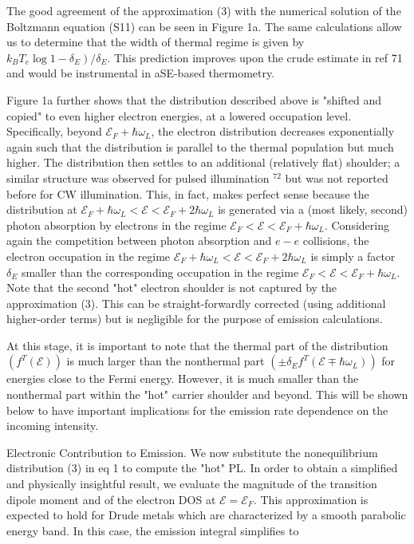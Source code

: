 \documentclass[10pt]{article}
\begin{document}
The good agreement of the approximation (3) with the numerical solution of the Boltzmann equation (S11) can be seen in Figure 1a. The same calculations allow us to determine that the width of thermal regime is given by $\left.k_{B} T_{e} \log 1-\delta_{E}\right) / \delta_{E}$. This prediction improves upon the crude estimate in ref 71 and would be instrumental in aSE-based thermometry.

Figure 1a further shows that the distribution described above is "shifted and copied" to even higher electron energies, at a lowered occupation level. Specifically, beyond $\mathcal{E}_{F}+\hbar \omega_{L}$, the electron distribution decreases exponentially again such that the distribution is parallel to the thermal population but much higher. The distribution then settles to an additional (relatively flat) shoulder; a similar structure was observed for pulsed illumination ${ }^{72}$ but was not reported before for CW illumination. This, in fact, makes perfect sense because the distribution at $\mathcal{E}_{F}+\hbar \omega_{L}<\mathcal{E}<\mathcal{E}_{F}+2 \hbar \omega_{L}$ is generated via a (most likely, second) photon absorption by electrons in the regime $\mathcal{E}_{F}<\mathcal{E}<\mathcal{E}_{F}+\hbar \omega_{L}$. Considering again the competition between photon absorption and $e-e$ collisions, the\\
electron occupation in the regime $\mathcal{E}_{F}+\hbar \omega_{L}<\mathcal{E}<\mathcal{E}_{F}+2 \hbar \omega_{L}$ is simply a factor $\delta_{E}$ smaller than the corresponding occupation in the regime $\mathcal{E}_{F}<\mathcal{E}<\mathcal{E}_{F}+\hbar \omega_{L}$. Note that the second "hot" electron shoulder is not captured by the approximation (3). This can be straight-forwardly corrected (using additional higher-order terms) but is negligible for the purpose of emission calculations.

At this stage, it is important to note that the thermal part of the distribution $\left(f^{T}(\mathcal{E})\right)$ is much larger than the nonthermal part $\left( \pm \delta_{E} f^{T}\left(\mathcal{E} \mp \hbar \omega_{L}\right)\right)$ for energies close to the Fermi energy. However, it is much smaller than the nonthermal part within the "hot" carrier shoulder and beyond. This will be shown below to have important implications for the emission rate dependence on the incoming intensity.

Electronic Contribution to Emission. We now substitute the nonequilibrium distribution (3) in eq 1 to compute the "hot" PL. In order to obtain a simplified and physically insightful result, we evaluate the magnitude of the transition dipole moment and of the electron DOS at $\mathcal{E}=\mathcal{E}_{F}$. This approximation is expected to hold for Drude metals which are characterized by a smooth parabolic energy band. In this case, the emission integral simplifies to
\end{document}

